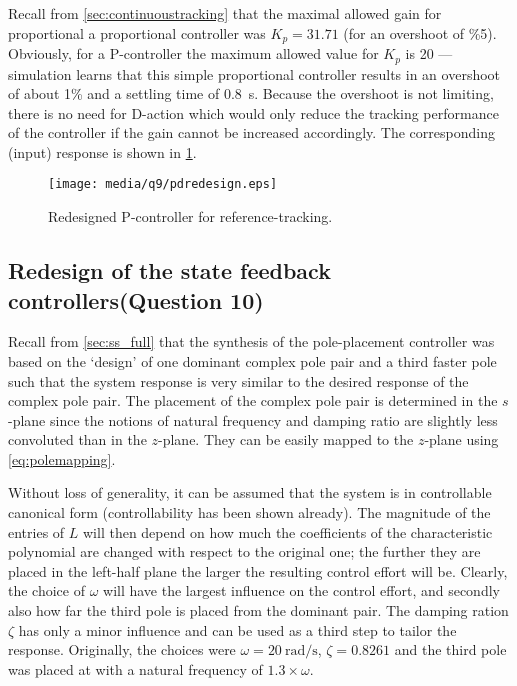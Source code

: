 Recall from \cref{sec:continuoustracking} that the maximal allowed gain for proportional a proportional controller was $K_p = 31.71$ (for an overshoot of \%5). Obviously, for a P-controller the maximum allowed value for $K_p$ is 20 --- simulation learns that this simple proportional controller results in an overshoot of about 1\% and a settling time of \SI{0.8}{\second}. Because the overshoot is not limiting, there is no need for D-action which would only reduce the tracking performance of the controller if the gain cannot be increased accordingly. The corresponding (input) response is shown in \cref{fig:q9_pdredesign}.
\begin{figure}[ht]
    \centering
    \texttt{[image: media/q9/pdredesign.eps]}
    \caption{Redesigned P-controller for reference-tracking.}
    \label{fig:q9_pdredesign}
\end{figure}
\FloatBarrier

\subsection{Redesign of the state feedback controllers\textnormal{\phantom{xxx}(Question 10)}}
\label{sec:retunepolep}
Recall from \cref{sec:ss_full} that the synthesis of the pole-placement controller was based on the `design' of one dominant complex pole pair and a third faster pole such that the system response is very similar to the desired response of the complex pole pair. The placement of the complex pole pair is determined in the $s$-plane since the notions of natural frequency and damping ratio are slightly less convoluted than in the $z$-plane. They can be easily mapped to the $z$-plane using \cref{eq:polemapping}.

Without loss of generality, it can be assumed that the system is in controllable canonical form (controllability has been shown already). The magnitude of the entries of $L$ will then depend on how much the coefficients of the characteristic polynomial are changed with respect to the original one; the further they are placed in the left-half plane the larger the resulting control effort will be. Clearly, the choice of $\omega$ will have the largest influence on the control effort, and secondly also how far the third pole is placed from the dominant pair. The damping ration $\zeta$ has only a minor influence and can be used as a third step to tailor the response. Originally, the choices were $\omega = \SI{20}{\radian\per\second}$, $\zeta = 0.8261$ and the third pole was placed at with a natural frequency of $1.3\times\omega$.

